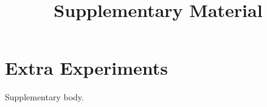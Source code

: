 \documentclass{article}
\title{Supplementary Material}
\begin{document}
\section{Extra Experiments}
Supplementary body.
\end{document}
